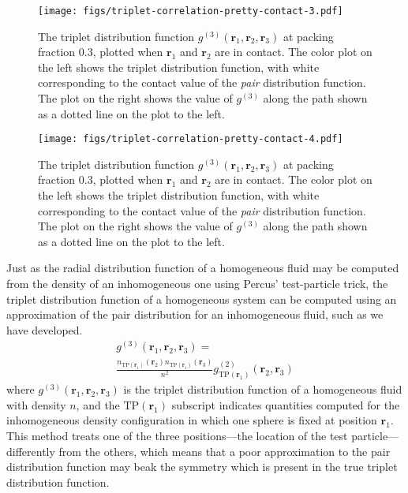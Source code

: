 \documentclass[letterpaper,twocolumn,amsmath,amssymb,pre,aps,10pt]{revtex4-1}
\newcommand{\rr}{\textbf{r}}
\begin{document}
\begin{figure}
  \texttt{[image: figs/triplet-correlation-pretty-contact-3.pdf]}
  \caption{The triplet distribution function
    $g^{(3)}(\rr_1,\rr_2,\rr_3)$ at packing fraction 0.3, plotted when
    $\rr_1$ and $\rr_2$ are in contact.  The color plot on the left
    shows the triplet distribution function, with white corresponding
    to the contact value of the \emph{pair} distribution function.
    The plot on the right shows the value of $g^{(3)}$ along the path
    shown as a dotted line on the plot to the
    left.}\label{fig:triplet-contact-distribution-3}
\end{figure}
\begin{figure}
  \texttt{[image: figs/triplet-correlation-pretty-contact-4.pdf]}
  \caption{The triplet distribution function
    $g^{(3)}(\rr_1,\rr_2,\rr_3)$ at packing fraction 0.3, plotted when
    $\rr_1$ and $\rr_2$ are in contact.  The color plot on the left
    shows the triplet distribution function, with white corresponding
    to the contact value of the \emph{pair} distribution function.
    The plot on the right shows the value of $g^{(3)}$ along the path
    shown as a dotted line on the plot to the
    left.}\label{fig:triplet-contact-distribution-4}
\end{figure}

Just as the radial distribution function of a homogeneous fluid may be
computed from the density of an inhomogeneous one using Percus'
test-particle trick, the triplet distribution function of a
homogeneous system can be computed using an approximation of the pair
distribution for an inhomogeneous fluid, such as we have developed.
\begin{multline}
    g^{(3)}(\rr_1,\rr_2,\rr_3) =\\
    \frac{n_{\textrm{TP}(\rr_1)}(\rr_2)
      n_{\textrm{TP}(\rr_1)}(\rr_3)}{n^2}
    g^{(2)}_{\textrm{TP}(\rr_1)}(\rr_2,\rr_3)
\end{multline}
where $g^{(3)}(\rr_1,\rr_2,\rr_3)$ is the triplet distribution
function of a homogeneous fluid with density $n$, and the
$\textrm{TP}(\rr_1)$ subscript indicates quantities computed for the
inhomogeneous density configuration in which one sphere is fixed at
position $\rr_1$.  This method treats one of the three positions---the
location of the test particle---differently from the others, which
means that a poor approximation to the pair distribution function may
beak the symmetry which is present in the true triplet distribution
function.
\end{document}

